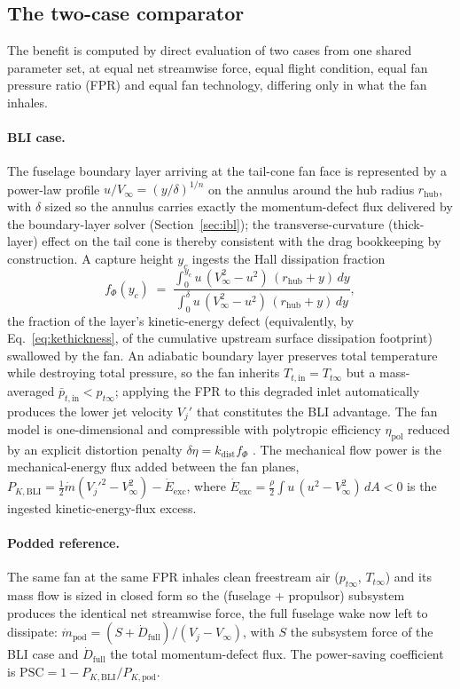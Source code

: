 \documentclass[10pt]{article}
\begin{document}
\subsection{The two-case comparator}\label{sec:comparator}

The benefit is computed by direct evaluation of two cases from one shared
parameter set, at equal net streamwise force, equal flight condition, equal
fan pressure ratio (FPR) and equal fan technology, differing only in what
the fan inhales.

\paragraph{BLI case.} The fuselage boundary layer arriving at the tail-cone
fan face is represented by a power-law profile $u/V_\infty=(y/\delta)^{1/n}$
on the annulus around the hub radius $r_{\mathrm{hub}}$, with $\delta$ sized
so the annulus carries exactly the momentum-defect flux delivered by the
boundary-layer solver (Section~\ref{sec:ibl}); the transverse-curvature
(thick-layer) effect on the tail cone is thereby consistent with the drag
bookkeeping by construction. A capture height $y_c$ ingests the Hall
dissipation fraction
%
\begin{equation}
  f_\Phi(y_c) \;=\;
  \frac{\int_0^{y_c} u\,(V_\infty^2-u^2)\,(r_{\mathrm{hub}}+y)\,dy}
       {\int_0^{\delta} u\,(V_\infty^2-u^2)\,(r_{\mathrm{hub}}+y)\,dy},
  \label{eq:fphi}
\end{equation}
%
the fraction of the layer's kinetic-energy defect (equivalently, by
Eq.~\eqref{eq:kethickness}, of the cumulative upstream surface dissipation
footprint) swallowed by the fan. An adiabatic boundary layer preserves
total temperature while destroying total pressure, so the fan inherits
$T_{t,\mathrm{in}}=T_{t\infty}$ but a mass-averaged
$\bar p_{t,\mathrm{in}}<p_{t\infty}$; applying the FPR to this degraded
inlet automatically produces the lower jet velocity $V_j'$ that constitutes
the BLI advantage. The fan model is one-dimensional and compressible with
polytropic efficiency $\eta_{\mathrm{pol}}$ reduced by an explicit
distortion penalty $\delta\eta = k_{\mathrm{dist}} f_\Phi$
\citep{fidalgo2012, gray2018}. The mechanical flow power is the
mechanical-energy flux added between the fan planes,
$P_{K,\mathrm{BLI}} = \tfrac12\dot m (V_j'^2 - V_\infty^2) -
\dot E_{\mathrm{exc}}$, where
$\dot E_{\mathrm{exc}}=\tfrac{\rho}{2}\!\int u\,(u^2-V_\infty^2)\,dA<0$ is
the ingested kinetic-energy-flux excess.

\paragraph{Podded reference.} The same fan at the same FPR inhales clean
freestream air ($p_{t\infty}$, $T_{t\infty}$) and its mass flow is sized in
closed form so the (fuselage + propulsor) subsystem produces the identical
net streamwise force, the full fuselage wake now left to dissipate:
$\dot m_{\mathrm{pod}} = (S + \dot D_{\mathrm{full}})/(V_j - V_\infty)$,
with $S$ the subsystem force of the BLI case and $\dot D_{\mathrm{full}}$
the total momentum-defect flux. The power-saving coefficient is
$\mathrm{PSC} = 1 - P_{K,\mathrm{BLI}} / P_{K,\mathrm{pod}}$.
\end{document}
